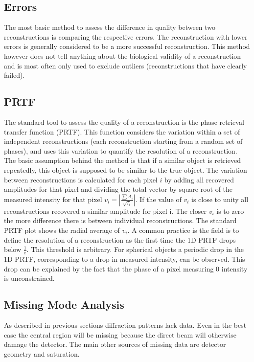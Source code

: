 \subsection{Errors}
The most basic method to assess the difference in quality between two reconstructions is comparing the respective errors. The reconstruction with lower errors is generally considered to be a more successful reconstruction. This method however does not tell anything about the biological validity of a reconstruction and is most often only used to exclude outliers (reconstructions that have clearly failed).
 
\subsection{PRTF}
The standard tool to assess the quality of a reconstruction is the phase retrieval transfer function (PRTF). This function considers the variation within a set of independent reconstructions (each reconstruction starting from a random set of phases), and uses this variation to quantify the resolution of a reconstruction. The basic assumption behind the method is that if a similar object is retrieved repeatedly, this object is supposed to be similar to the true object. The variation between reconstructions is calculated for each pixel $i$ by adding all recovered amplitudes for that pixel and dividing the total vector by square root of the measured intensity for that pixel $v_i = |\frac{\sum A_i}{\sqrt{I_i}}|$. If the value of $v_i$ is close to unity all reconstructions recovered a similar amplitude for pixel i. The closer $v_i$ is to zero the more difference there is between individual reconstructions. The standard PRTF plot shows the radial average of $v_i$. A common practice is the field is to define the resolution of a reconstruction as the first time the 1D PRTF drops below $\frac{1}{e}$. This threshold is arbitrary. For spherical objects a periodic drop in the 1D PRTF, corresponding to a drop in measured intensity, can be observed. This drop can be explained by the fact that the phase of a pixel measuring 0 intensity is unconstrained.
 
\subsection{Missing Mode Analysis}
As described in previous sections diffraction patterns lack data. Even in the best case the central region will be missing because the direct beam will otherwise damage the detector. The main other sources of missing data are detector geometry and saturation. 

